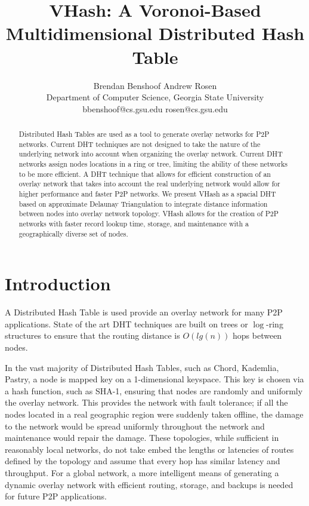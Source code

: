 \documentclass{IEEEtran}
\title{VHash: A Voronoi-Based Multidimensional Distributed Hash Table}
\author{Brendan Benshoof \qquad Andrew Rosen  \\Department of Computer Science, Georgia State University\\  bbenshoof@cs.gsu.edu \qquad rosen@cs.gsu.edu }
\date{} %
\begin{document}
\maketitle

\begin{abstract}
Distributed Hash Tables are used as a tool to generate overlay networks for P2P networks. Current DHT techniques are not designed to take the nature of the underlying network into account when organizing the overlay network. Current DHT networks assign nodes locations in a ring or tree, limiting the ability of these networks to be more efficient.
A DHT technique that allows for efficient construction of an overlay network that takes into account the real underlying network would allow for higher performance and faster P2P networks.
We present VHash as a spacial DHT based on approximate Delaunay Triangulation to integrate distance information between nodes into overlay network topology.
VHash allows for the creation of P2P networks with faster record lookup time, storage, and maintenance with a geographically diverse set of nodes.

\end{abstract}
\section{Introduction}
A Distributed Hash Table is used provide an overlay network for many P2P applications. State of the art DHT techniques are built on trees or $\log$-ring structures to ensure that the routing distance is $O(lg(n))$ hops between nodes. 

In the vast majority of Distributed Hash Tables, such as Chord, Kademlia, Pastry, a node is mapped key on a 1-dimensional keyspace.  This key is chosen via a hash function, such as SHA-1, ensuring that nodes are randomly and uniformly the overlay network.
This provides the network with fault tolerance; if all the nodes located in a real geographic region were suddenly taken offline, the damage to the network would be spread uniformly throughout the network and maintenance would repair the damage.  
These topologies, while sufficient in reasonably local networks, do not take embed the lengths or latencies of routes defined by the topology and assume that every hop has similar latency and throughput. For a global network, a more intelligent means of generating a dynamic overlay network with efficient routing, storage, and backups is needed for future P2P applications.
\end{document}
